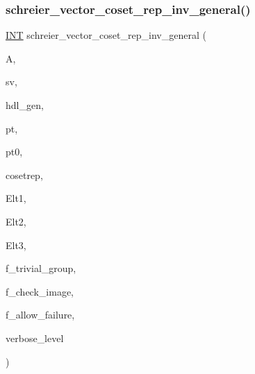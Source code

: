\subsubsection{\texorpdfstring{schreier\+\_\+vector\+\_\+coset\+\_\+rep\+\_\+inv\+\_\+general()}{schreier\_vector\_coset\_rep\_inv\_general()}}
{\footnotesize\ttfamily \mbox{\hyperlink{galois_8h_a09fddde158a3a20bd2dcadb609de11dc}{I\+NT}} schreier\+\_\+vector\+\_\+coset\+\_\+rep\+\_\+inv\+\_\+general (\begin{DoxyParamCaption}\item[{\mbox{\hyperlink{classaction}{action}} $\ast$}]{A,  }\item[{\mbox{\hyperlink{galois_8h_a09fddde158a3a20bd2dcadb609de11dc}{I\+NT}} $\ast$}]{sv,  }\item[{\mbox{\hyperlink{galois_8h_a09fddde158a3a20bd2dcadb609de11dc}{I\+NT}} $\ast$}]{hdl\+\_\+gen,  }\item[{\mbox{\hyperlink{galois_8h_a09fddde158a3a20bd2dcadb609de11dc}{I\+NT}}}]{pt,  }\item[{\mbox{\hyperlink{galois_8h_a09fddde158a3a20bd2dcadb609de11dc}{I\+NT}} \&}]{pt0,  }\item[{\mbox{\hyperlink{galois_8h_a09fddde158a3a20bd2dcadb609de11dc}{I\+NT}} $\ast$}]{cosetrep,  }\item[{\mbox{\hyperlink{galois_8h_a09fddde158a3a20bd2dcadb609de11dc}{I\+NT}} $\ast$}]{Elt1,  }\item[{\mbox{\hyperlink{galois_8h_a09fddde158a3a20bd2dcadb609de11dc}{I\+NT}} $\ast$}]{Elt2,  }\item[{\mbox{\hyperlink{galois_8h_a09fddde158a3a20bd2dcadb609de11dc}{I\+NT}} $\ast$}]{Elt3,  }\item[{\mbox{\hyperlink{galois_8h_a09fddde158a3a20bd2dcadb609de11dc}{I\+NT}}}]{f\+\_\+trivial\+\_\+group,  }\item[{\mbox{\hyperlink{galois_8h_a09fddde158a3a20bd2dcadb609de11dc}{I\+NT}}}]{f\+\_\+check\+\_\+image,  }\item[{\mbox{\hyperlink{galois_8h_a09fddde158a3a20bd2dcadb609de11dc}{I\+NT}}}]{f\+\_\+allow\+\_\+failure,  }\item[{\mbox{\hyperlink{galois_8h_a09fddde158a3a20bd2dcadb609de11dc}{I\+NT}}}]{verbose\+\_\+level }\end{DoxyParamCaption})}

\mbox{\label{schreier__vector_8_c_a4211d4550d8e1aef8ac05ed93068b990}} 

